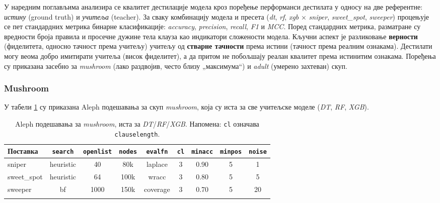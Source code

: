 У наредним поглављима анализира се квалитет дестилације модела кроз поређење перформанси дестилата у односу на две референтне: \emph{истину} (ground truth) и \emph{учитеља} (teacher). За сваку комбинацију модела и пресета (\textit{dt}, \textit{rf}, \textit{xgb} × \textit{sniper}, \textit{sweet\_spot}, \textit{sweeper}) процењује се пет стандардних метрика бинарне класификације: \textit{accuracy}, \textit{precision}, \textit{recall}, \textit{F1} и \textit{MCC}. Поред стандардних метрика, разматране су вредности броја правила и просечне дужине тела клауза као индикатори сложености модела.
Кључни аспект је разликовање \textbf{верности} (фиделитета, односно тачност према учитељу) учитељу од \textbf{стварне тачности} према истини (тачност према реалним ознакама). Дестилати могу веома добро имитирати учитеља (висок фиделитет), а да притом не побољшају реалан квалитет према истинитим ознакама.
Поређења су приказана засебно за \textit{mushroom} (лако раздвојив, често близу „максимума“) и \textit{adult} (умерено захтеван) скуп. 

\subsubsection{Mushroom}

У табели \ref{tab:aleph-mushroom} су приказана Aleph подешавања за скуп \textit{mushroom}, која су иста за све учитељске моделе (\textit{DT}, \textit{RF}, \textit{XGB}). 

\begin{table}[H]
\centering
\small
\setlength{\tabcolsep}{4pt}
\begin{tabularx}{\textwidth}{@{} l c c c c c c c c @{}}
\toprule
\textbf{Поставка} & \texttt{search} & \texttt{openlist} & \texttt{nodes} & \texttt{evalfn} & \texttt{cl} & \texttt{minacc} & \texttt{minpos} & \texttt{noise} \\
\midrule
sniper      & heuristic & 40   & 80k  & laplace  & 3 & 0.90 & 5 & 1  \\
sweet\_spot & heuristic & 64   & 100k  & wracc    & 3 & 0.80 & 5 & 5  \\
sweeper     & bf        & 1000 & 150k & coverage & 3 & 0.70 & 5 & 20 \\
\bottomrule
\caption{Aleph подешавања за \textit{mushroom}, иста за \textit{DT}/\textit{RF}/\textit{XGB}. Напомена: \texttt{cl} означава \texttt{clauselength}.}
\label{tab:aleph-mushroom}
\end{tabularx}
\end{table}

